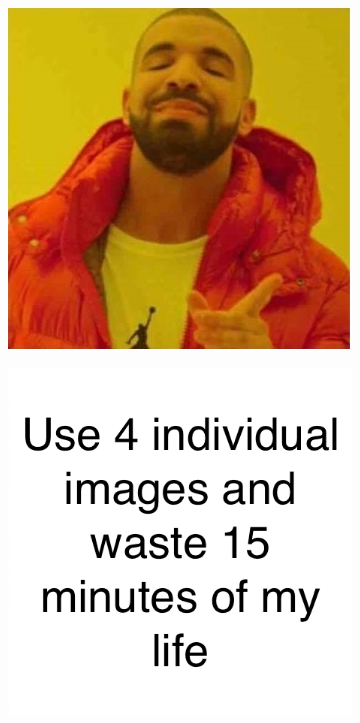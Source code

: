 \begin{figure}[!h]
\begin{subfigure}[t]{.5\textwidth}
  \end{subfigure}

  \begin{subfigure}[t]{.5\textwidth}
    \centering
    \includegraphics[width=\linewidth]{figures/drakebl}
  \end{subfigure}
  \hfill
  \begin{subfigure}[t]{.5\textwidth}
    \centering
    \includegraphics[width=\linewidth]{figures/drakebr}

\end{subfigure}
\end{figure}
